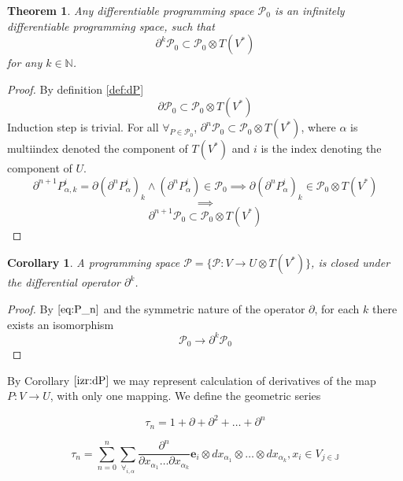 \documentclass{article}
\newcommand{\JJ}{\mathbb{J}}
\newcommand{\e}{\mathbf{e}}
\newcommand{\dP}{\mathcal{P}}
\newcommand{\D}{\partial}
\newcommand{\sumd}{\tau}
\newtheorem{izrek}{Theorem}[section]
\newtheorem{corollary}{Corollary}[section]
\begin{document}
\begin{izrek}\label{izr:P}
	Any differentiable programming space $\dP_0$ is an
  infinitely differentiable programming space, such that
	\begin{equation}\label{eq:P_n}
	 		\D^k\dP_0\subset\dP_0\otimes T(V^*)
	 	\end{equation}
for any $k\in\mathbb{N}$.
\end{izrek}
\begin{proof} By definition \ref{def:dP}
$$\D\dP_0\subset\dP_0\otimes T(V^*)$$
	Induction step is trivial. For all 	$\forall_{P\in\dP_0}$,
  $\D^n\dP_0\subset\dP_0\otimes T(V^*)$, where
  $\alpha$ is multiindex denoted the component of $T(V^*)$ and $i$ is the
  index denoting the component of $U$.
	\begin{equation}\label{eq:inductionStep}
\D^{n+1}P_{\alpha,k}^i=\D(\D^n P^i_\alpha)_k\land(\D^n P^i_\alpha)\in\dP_0\implies \D(\D^n P^i_\alpha)_k\in \dP_0\otimes T(V^*)
	\end{equation}
	$$\implies$$
	$$\D^{n+1}\dP_0\subset\dP_0\otimes T(V^*)$$
\end{proof}

 \begin{corollary}\label{izr:dP}
	A programming space $\dP=\{\dP:V\to U\otimes T(V^*)\}$, is closed under the differential operator $\D^k$.
 \end{corollary}
 \begin{proof}
 	 By $\eqref{eq:P_n}$ and the symmetric nature of the operator $\D$, for each $k$ there exists an isomorphism
 	 	\begin{equation}
 	 		\dP_0\to\D^k\dP_0
 	 	\end{equation}
 \end{proof}

By Corollary $\ref{izr:dP}$ we may represent calculation of derivatives of the map $P:V\to U$, with only one mapping. We define the geometric series
 
 \begin{equation}\label{eq:DD}
  	\sumd_n = 1+\D +\D^2 +\ldots + \D^n 
  \end{equation}
  
  
  \begin{equation}
  	\sumd_n=\sum\limits_{n=0}^{n}\sum_{\forall_{i,\alpha}}\frac{\partial^n}{\partial
  		    x_{\alpha_1}\ldots \partial x_{\alpha_k}}\e_i\otimes
  		  dx_{\alpha_1}\otimes\ldots \otimes dx_{\alpha_k} , x_i\in V_{j\in\JJ}
  \end{equation}
  
\end{document}

